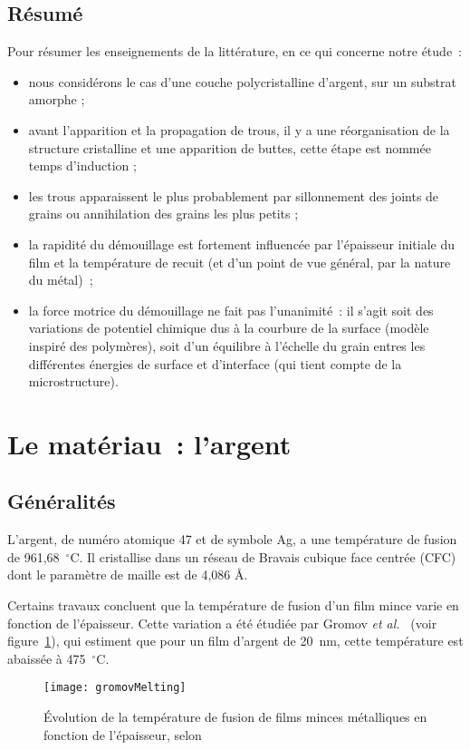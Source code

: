 	\subsection{Résumé}
Pour résumer les enseignements de la littérature, en ce qui concerne notre étude~:
\begin{itemize}
\item nous considérons le cas d'une couche polycristalline d'argent, sur un substrat amorphe ;
\item avant l'apparition et la propagation de trous, il y a une réorganisation de la structure cristalline et une apparition de buttes, cette étape est nommée \og temps d'induction \fg{} ;
\item les trous apparaissent le plus probablement par sillonnement des joints de grains ou annihilation des grains les plus petits ;
\item la rapidité du démouillage est fortement influencée par l'épaisseur initiale du film et la température de recuit (et d'un point de vue général, par la nature du métal)~;
\item la force motrice du démouillage ne fait pas l'unanimité~: il s'agit soit des variations de potentiel chimique dus à la courbure de la surface (modèle inspiré des polymères), soit d'un équilibre à l'échelle du grain entres les différentes énergies de surface et d'interface (qui tient compte de la microstructure).
\end{itemize}

\section{Le matériau~: l'argent}
	\subsection{Généralités}
L'argent, de numéro atomique 47 et de symbole Ag, a une température de fusion de 961,68~$^\circ$C.
Il cristallise dans un réseau de Bravais cubique face centrée (CFC) dont le paramètre de maille
est de 4,086 Å.\par 
Certains travaux concluent que la température de fusion d'un film mince varie en fonction de l'épaisseur. Cette variation a été étudiée par Gromov \textit{et al.}~\cite{gromov2011heterogeneous} (voir figure~\ref{gromovMelting}), qui estiment que pour un film d'argent de 20~nm, cette température est abaissée à 475~$^\circ$C.\par 
\begin{figure}[!htb]
	\centering
	\texttt{[image: gromovMelting]}
	\caption{Évolution de la température de fusion de films minces métalliques en fonction de
l'épaisseur, selon~\cite{gromov2011heterogeneous}}
	\label{gromovMelting}
\end{figure}

